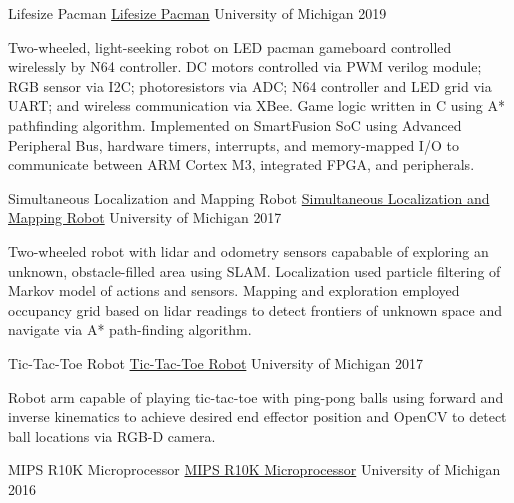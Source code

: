 \documentclass[11pt, a4paper]{cv}
\newenvironment{projects}{}{\par}
\newenvironment{cv}{}{\par}
\begin{document}
\begin{cv}
\begin{projects}
\begin{cventries}
\cventrycompact
{
{Lifesize Pacman}
{\color{hrefblue}\href{https://drive.google.com/drive/folders/1HFxNVsQWryOYPgpBHcxYYqhqPPS5R\_EB}{Lifesize Pacman}}}
{}
{University of Michigan}
{2019}
{\begin{cvparagraph}
Two-wheeled, light-seeking robot on LED pacman gameboard controlled wirelessly by N64 controller. DC motors controlled via PWM verilog module; RGB sensor via I2C; photoresistors via ADC; N64 controller and LED grid via UART; and wireless communication via XBee. Game logic written in C using A* pathfinding algorithm. Implemented on SmartFusion SoC using Advanced Peripheral Bus, hardware timers, interrupts, and memory-mapped I/O to communicate between ARM Cortex M3, integrated FPGA, and peripherals.
\end{cvparagraph}}
\cventrycompact
{
{Simultaneous Localization and Mapping Robot}
{\color{hrefblue}\href{https://drive.google.com/drive/folders/1YjzT\_7qpdkZjQ76zcOCCvEo-v1gyrCbw}{Simultaneous Localization and Mapping Robot}}}
{}
{University of Michigan}
{2017}
{\begin{cvparagraph}
Two-wheeled robot with lidar and odometry sensors capabable of exploring an unknown, obstacle-filled area using SLAM. Localization used particle filtering of Markov model of actions and sensors. Mapping and exploration employed occupancy grid based on lidar readings to detect frontiers of unknown space and navigate via A* path-finding algorithm.
\end{cvparagraph}}
\cventrycompact
{
{Tic-Tac-Toe Robot}
{\color{hrefblue}\href{https://drive.google.com/drive/folders/102AN8otUolVnhyJ00cVi4qK0T-imfvds}{Tic-Tac-Toe Robot}}}
{}
{University of Michigan}
{2017}
{\begin{cvparagraph}
Robot arm capable of playing tic-tac-toe with ping-pong balls using forward and inverse kinematics to achieve desired end effector position and OpenCV to detect ball locations via RGB-D camera.
\end{cvparagraph}}
\cventrycompact
{
{MIPS R10K Microprocessor}
{\color{hrefblue}\href{https://drive.google.com/drive/folders/1Zar\_EmEbRwZw6HVLnNumsjWDx8cLE\_pI}{MIPS R10K Microprocessor}}}
{}
{University of Michigan}
{2016}
{\begin{cvparagraph}

\end{cvparagraph}}
\end{cventries}
\end{projects}
\end{cv}
\end{document}
